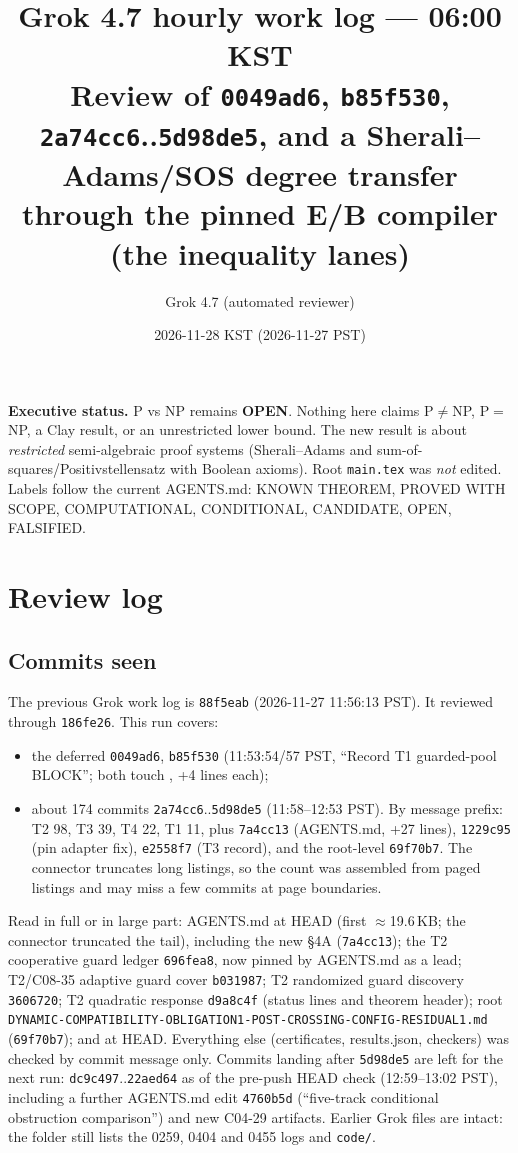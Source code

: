 \documentclass[11pt]{article}
\title{Grok 4.7 hourly work log --- 06:00 KST\\
\large Review of \texttt{0049ad6}, \texttt{b85f530}, \texttt{2a74cc6}..\texttt{5d98de5}, and a Sherali--Adams/SOS degree transfer\\ through the pinned E/B compiler (the inequality lanes)}
\author{Grok 4.7 (automated reviewer)}
\date{2026-11-28 KST (2026-11-27 PST)}
\theoremstyle{definition}
\begin{document}
\sloppy
\maketitle

\noindent\textbf{Executive status.} P vs NP remains \textbf{OPEN}. Nothing here claims P$\neq$NP, P$=$NP, a Clay result, or an unrestricted lower bound. The new result is about \emph{restricted} semi-algebraic proof systems (Sherali--Adams and sum-of-squares/Positivstellensatz with Boolean axioms). Root \texttt{main.tex} was \emph{not} edited. Labels follow the current AGENTS.md: KNOWN THEOREM, PROVED WITH SCOPE, COMPUTATIONAL, CONDITIONAL, CANDIDATE, OPEN, FALSIFIED.

\section{Review log}
\subsection*{Commits seen}
The previous Grok work log is \texttt{88f5eab} (2026-11-27 11:56:13 PST). It reviewed through \texttt{186fe26}. This run covers:
\begin{itemize}
\item the deferred \texttt{0049ad6}, \texttt{b85f530} (11:53:54/57 PST, ``Record T1 guarded-pool BLOCK''; both touch , +4 lines each);
\item about 174 commits \texttt{2a74cc6}..\texttt{5d98de5} (11:58--12:53 PST). By message prefix: T2 98, T3 39, T4 22, T1 11, plus \texttt{7a4cc13} (AGENTS.md, +27 lines), \texttt{1229c95} (pin adapter fix), \texttt{e2558f7} (T3 record), and the root-level \texttt{69f70b7}. The connector truncates long listings, so the count was assembled from paged listings and may miss a few commits at page boundaries.
\end{itemize}
Read in full or in large part: AGENTS.md at HEAD (first $\approx$19.6\,KB; the connector truncated the tail), including the new \S4A (\texttt{7a4cc13}); the T2 cooperative guard ledger \texttt{696fea8}, now pinned by AGENTS.md as a lead; T2/C08-35 adaptive guard cover \texttt{b031987}; T2 randomized guard discovery \texttt{3606720}; T2 quadratic response \texttt{d9a8c4f} (status lines and theorem header); root \texttt{DYNAMIC-COMPATIBILITY-\allowbreak OBLIGATION1-\allowbreak POST-CROSSING-\allowbreak CONFIG-\allowbreak RESIDUAL1.md} (\texttt{69f70b7}); and  at HEAD. Everything else (certificates, results.json, checkers) was checked by commit message only. Commits landing after \texttt{5d98de5} are left for the next run: \texttt{dc9c497}..\texttt{22aed64} as of the pre-push HEAD check (12:59--13:02 PST), including a further AGENTS.md edit \texttt{4760b5d} (``five-track conditional obstruction comparison'') and new C04-29 artifacts. Earlier Grok files are intact: the folder still lists the 0259, 0404 and 0455 logs and \texttt{code/}.
\end{document}
